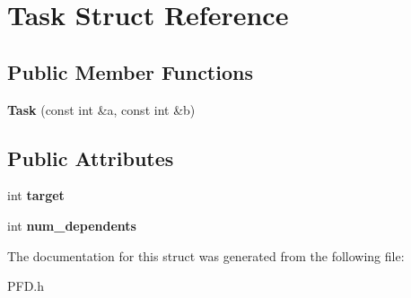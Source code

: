 \hypertarget{structTask}{\section{Task Struct Reference}
\label{structTask}
}
\subsection*{Public Member Functions}
\begin{DoxyCompactItemize}
\item 
\hypertarget{structTask_a7d452acce0a17b4d512b5311ca26d9ee}{{\bfseries Task} (const int \&a, const int \&b)}\label{structTask_a7d452acce0a17b4d512b5311ca26d9ee}

\end{DoxyCompactItemize}
\subsection*{Public Attributes}
\begin{DoxyCompactItemize}
\item 
\hypertarget{structTask_ad8d27b19d1aa808f7fe36469dfe4bb44}{int {\bfseries target}}\label{structTask_ad8d27b19d1aa808f7fe36469dfe4bb44}

\item 
\hypertarget{structTask_ab9f35989f0c6a067626d63ca755bf3c0}{int {\bfseries num\-\_\-dependents}}\label{structTask_ab9f35989f0c6a067626d63ca755bf3c0}

\end{DoxyCompactItemize}


The documentation for this struct was generated from the following file\-:\begin{DoxyCompactItemize}
\item 
P\-F\-D.\-h\end{DoxyCompactItemize}
